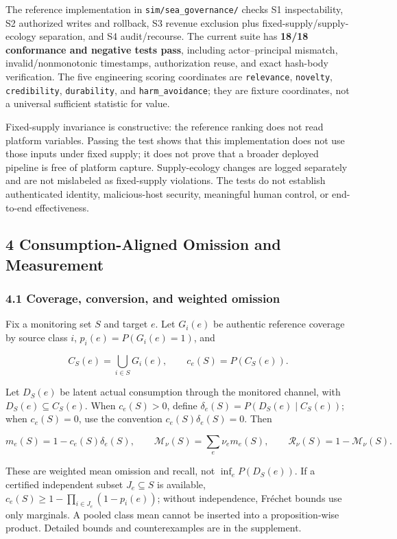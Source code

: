 \documentclass[
  11pt]{article}
\begin{document}
The reference implementation in \texttt{sim/sea\_governance/} checks S1
inspectability, S2 authorized writes and rollback, S3 revenue exclusion
plus fixed-supply/supply-ecology separation, and S4 audit/recourse. The
current suite has \textbf{18/18 conformance and negative tests pass},
including actor--principal mismatch, invalid/nonmonotonic timestamps,
authorization reuse, and exact hash-body verification. The five
engineering scoring coordinates are \texttt{relevance},
\texttt{novelty}, \texttt{credibility}, \texttt{durability}, and
\texttt{harm\_avoidance}; they are fixture coordinates, not a universal
sufficient statistic for value.

Fixed-supply invariance is constructive: the reference ranking does not
read platform variables. Passing the test shows that this implementation
does not use those inputs under fixed supply; it does not prove that a
broader deployed pipeline is free of platform capture. Supply-ecology
changes are logged separately and are not mislabeled as fixed-supply
violations. The tests do not establish authenticated identity,
malicious-host security, meaningful human control, or end-to-end
effectiveness.

\subsection{4 Consumption-Aligned Omission and
Measurement}\label{consumption-aligned-omission-and-measurement}

\subsubsection{4.1 Coverage, conversion, and weighted
omission}\label{coverage-conversion-and-weighted-omission}

Fix a monitoring set \(S\) and target \(e\). Let \(G_i(e)\) be authentic
reference coverage by source class \(i\), \(p_i(e)=P(G_i(e)=1)\), and

\[C_S(e)=\bigcup_{i\in S}G_i(e),\qquad c_e(S)=P(C_S(e)).\]

Let \(D_S(e)\) be latent actual consumption through the monitored
channel, with \(D_S(e)\subseteq C_S(e)\). When \(c_e(S)>0\), define
\(\delta_e(S)=P(D_S(e)\mid C_S(e))\); when \(c_e(S)=0\), use the
convention \(c_e(S)\delta_e(S)=0\). Then

\[m_e(S)=1-c_e(S)\delta_e(S),\qquad \mathcal M_\nu(S)=\sum_e\nu_e m_e(S),\qquad \mathcal R_\nu(S)=1-\mathcal M_\nu(S).\tag{4}\]

These are weighted mean omission and recall, not \(\inf_e P(D_S(e))\).
If a certified independent subset \(J_e\subseteq S\) is available,
\(c_e(S)\ge1-\prod_{i\in J_e}(1-p_i(e))\); without independence, Fréchet
bounds use only marginals. A pooled class mean cannot be inserted into a
proposition-wise product. Detailed bounds and counterexamples are in the
supplement.
\end{document}

